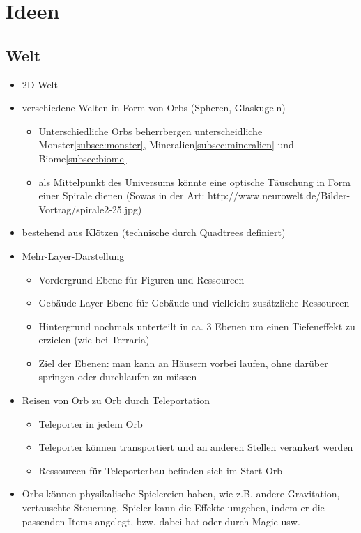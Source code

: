 \section{Ideen}
\label{sec:ideen}

\subsection{Welt}
\label{subsec:welt}
\begin{itemize}
	\item 2D-Welt
	\item verschiedene Welten in Form von Orbs (Spheren, Glaskugeln)
	\begin{itemize}
		\item Unterschiedliche Orbs beherrbergen unterscheidliche Monster\ref{subsec:monster}, Mineralien\ref{subsec:mineralien} und Biome\ref{subsec:biome}
		\item als Mittelpunkt des Universums könnte eine optische Täuschung in Form einer Spirale dienen (Sowas in der Art: http://www.neurowelt.de/Bilder-Vortrag/spirale2-25.jpg)
	\end{itemize}
	\item bestehend aus Klötzen (technische durch Quadtrees definiert)
	\item Mehr-Layer-Darstellung
	\begin{itemize}
		\item Vordergrund
			\subitem Ebene für Figuren und Ressourcen
		\item Gebäude-Layer
			\subitem Ebene für Gebäude und vielleicht zusätzliche Ressourcen
		\item Hintergrund
			\subitem nochmals unterteilt in ca. 3 Ebenen um einen Tiefeneffekt zu erzielen (wie bei Terraria)
		\item Ziel der Ebenen: man kann an Häusern vorbei laufen, ohne darüber springen oder durchlaufen zu müssen
	\end{itemize}
	\item Reisen von Orb zu Orb durch Teleportation
	\begin{itemize}
		\item Teleporter in jedem Orb
		\item Teleporter können transportiert und an anderen Stellen verankert werden
		\item Ressourcen für Teleporterbau befinden sich im Start-Orb
	\end{itemize}
	\item Orbs können physikalische Spielereien haben, wie z.B. andere Gravitation, vertauschte Steuerung. Spieler kann die Effekte umgehen, indem er die passenden Items angelegt, bzw. dabei hat oder durch Magie usw.
\end{itemize}


